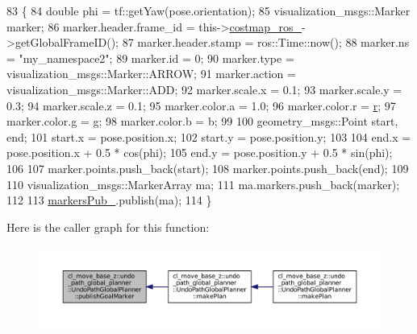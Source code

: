 \begin{DoxyCode}
83         \{
84             \textcolor{keywordtype}{double} phi = tf::getYaw(pose.orientation);
85             visualization\_msgs::Marker marker;
86             marker.header.frame\_id = this->\hyperlink{classcl__move__base__z_1_1undo__path__global__planner_1_1UndoPathGlobalPlanner_ab63eeb465e3ae989a6edcc4d059cf8f0}{costmap\_ros\_}->getGlobalFrameID();
87             marker.header.stamp = ros::Time::now();
88             marker.ns = \textcolor{stringliteral}{"my\_namespace2"};
89             marker.id = 0;
90             marker.type = visualization\_msgs::Marker::ARROW;
91             marker.action = visualization\_msgs::Marker::ADD;
92             marker.scale.x = 0.1;
93             marker.scale.y = 0.3;
94             marker.scale.z = 0.1;
95             marker.color.a = 1.0;
96             marker.color.r = \hyperlink{namespacefake__cube__perception__node_a36e88703ab69fd35065e8a8d9344903e}{r};
97             marker.color.g = g;
98             marker.color.b = b;
99 
100             geometry\_msgs::Point start, end;
101             start.x = pose.position.x;
102             start.y = pose.position.y;
103 
104             end.x = pose.position.x + 0.5 * cos(phi);
105             end.y = pose.position.y + 0.5 * sin(phi);
106 
107             marker.points.push\_back(start);
108             marker.points.push\_back(end);
109 
110             visualization\_msgs::MarkerArray ma;
111             ma.markers.push\_back(marker);
112 
113             \hyperlink{classcl__move__base__z_1_1undo__path__global__planner_1_1UndoPathGlobalPlanner_abfa0536872a0e3f8c823bebf0ed398fb}{markersPub\_}.publish(ma);
114         \}
\end{DoxyCode}
Here is the caller graph for this function\+:
\nopagebreak
\begin{figure}[H]
\begin{center}
\leavevmode
\includegraphics[width=350pt]{classcl__move__base__z_1_1undo__path__global__planner_1_1UndoPathGlobalPlanner_a37a85e1cd57173902d8302cb8cb9b933_icgraph}
\end{center}
\end{figure}


